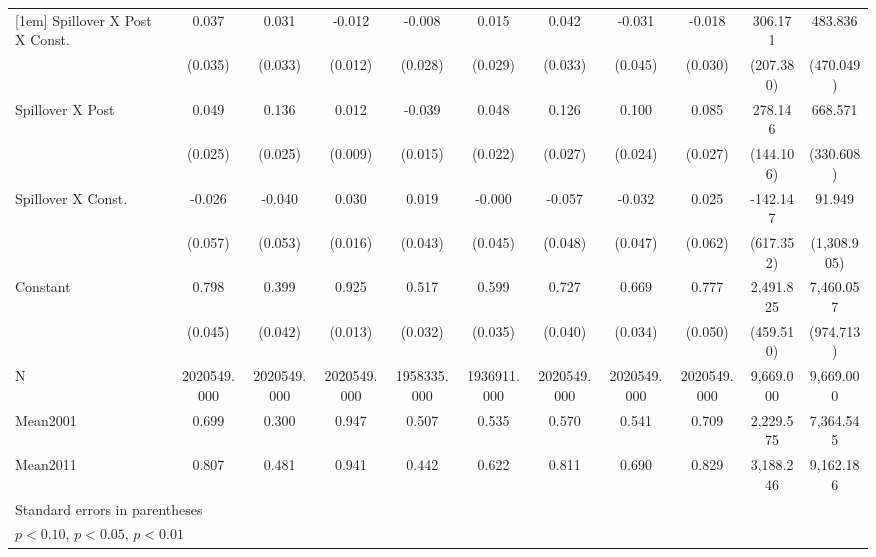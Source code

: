 {\begin{tabular}{l*{10}{c}}
[1em]
Spillover X Post X Const.&    0.037         &    0.031         &   -0.012         &   -0.008         &    0.015         &    0.042         &   -0.031         &   -0.018         &  306.171         &  483.836         \\
                &  (0.035)         &  (0.033)         &  (0.012)         &  (0.028)         &  (0.029)         &  (0.033)         &  (0.045)         &  (0.030)         &(207.380)         &(470.049)         \\
[1em]
Spillover X Post&    0.049\sym{*}  &    0.136\sym{***}&    0.012         &   -0.039\sym{**} &    0.048\sym{**} &    0.126\sym{***}&    0.100\sym{***}&    0.085\sym{***}&  278.146\sym{*}  &  668.571\sym{**} \\
                &  (0.025)         &  (0.025)         &  (0.009)         &  (0.015)         &  (0.022)         &  (0.027)         &  (0.024)         &  (0.027)         &(144.106)         &(330.608)         \\
[1em]
Spillover X Const.&   -0.026         &   -0.040         &    0.030\sym{*}  &    0.019         &   -0.000         &   -0.057         &   -0.032         &    0.025         & -142.147         &   91.949         \\
                &  (0.057)         &  (0.053)         &  (0.016)         &  (0.043)         &  (0.045)         &  (0.048)         &  (0.047)         &  (0.062)         &(617.352)         &(1,308.905)         \\
[1em]
Constant        &    0.798\sym{***}&    0.399\sym{***}&    0.925\sym{***}&    0.517\sym{***}&    0.599\sym{***}&    0.727\sym{***}&    0.669\sym{***}&    0.777\sym{***}&2,491.825\sym{***}&7,460.057\sym{***}\\
                &  (0.045)         &  (0.042)         &  (0.013)         &  (0.032)         &  (0.035)         &  (0.040)         &  (0.034)         &  (0.050)         &(459.510)         &(974.713)         \\
\hline
N               &2020549.000         &2020549.000         &2020549.000         &1958335.000         &1936911.000         &2020549.000         &2020549.000         &2020549.000         &9,669.000         &9,669.000         \\
Mean2001        &    0.699         &    0.300         &    0.947         &    0.507         &    0.535         &    0.570         &    0.541         &    0.709         &2,229.575         &7,364.545         \\
Mean2011        &    0.807         &    0.481         &    0.941         &    0.442         &    0.622         &    0.811         &    0.690         &    0.829         &3,188.246         &9,162.186         \\
\hline\hline
\multicolumn{11}{l}{\footnotesize Standard errors in parentheses}\\
\multicolumn{11}{l}{\footnotesize \sym{*} \(p<0.10\), \sym{**} \(p<0.05\), \sym{***} \(p<0.01\)}\\
\end{tabular}
}
